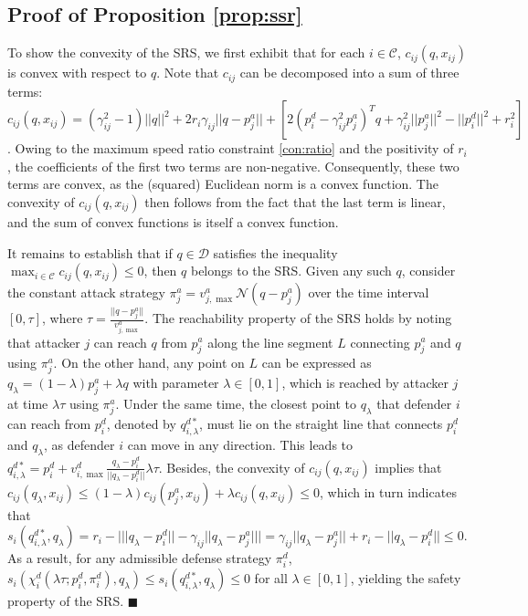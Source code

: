 \documentclass[journal]{IEEEtran}
\newenvironment{Proof}{\noindent{\em Proof:\/}}{\hfill $\blacksquare$\par}
\newcommand{\n}{\mathscr{N}}
\newcommand{\D}{\mathcal{D}}
\newcommand{\C}{\mathcal{C}}
\newcommand{\1}{\mathbf{1}}
\begin{document}
\subsection{Proof of Proposition \ref{prop:ssr}}\label{proof:ssr}
\begin{Proof}
To show the convexity of the SRS, we first exhibit that for each $i\in \C$, $c_{ij}(q,x_{ij})$ is convex with respect to $q$. Note that $c_{ij}$ can be decomposed into a sum of three terms: $c_{ij}(q,x_{ij})=(\gamma_{ij}^2-1)||q||^2+2r_i\gamma_{ij}||q-p^a_j||+[2(p^d_i-\gamma_{ij}^2p^a_j)^Tq+\gamma_{ij}^2||p^a_j||^2-||p^d_i||^2+r_i^2]$.
Owing to the maximum speed ratio constraint \eqref{con:ratio} and the positivity of $r_i$, the coefficients of the first two terms are non-negative. Consequently, these two terms are convex, as the (squared) Euclidean norm is a convex function. The convexity of $c_{ij}(q,x_{ij})$ then follows from the fact that the last term is linear, and the sum of convex functions is itself a convex function.

It remains to establish that if $q\in \D$ satisfies the inequality $\max_{i\in \C}c_{ij}(q,x_{ij})\leq 0$, then $q$ belongs to the SRS. Given any such $q$, consider the constant attack strategy $\pi^a_j=v^a_{j,\max}\n(q-p^a_j)$ over the time interval $[0,\tau]$, where $\tau=\frac{||q-p^a_j||}{v^a_{j,\max}}$.
The reachability property of the SRS holds by noting that attacker $j$ can reach $q$ from $p^a_j$ along the line segment $L$ connecting $p^a_j$ and $q$ using $\pi^a_j$. 
On the other hand, any point on $L$ can be expressed as $q_\lambda=(1-\lambda)p^a_j+\lambda q$ with parameter $\lambda\in [0,1]$, which is reached by attacker $j$ at time $\lambda\tau$ using $\pi^a_j$. 
Under the same time, the closest point to $q_\lambda$ that defender $i$ can reach from $p^d_i$, denoted by $q^{d*}_{i,\lambda}$, must lie on the straight line that connects $p^d_i$ and $q_\lambda$, as defender $i$ can move in any direction. This leads to $q^{d*}_{i,\lambda}=p^d_i+v^d_{i,\max}\frac{q_\lambda-p^d_i}{||q_\lambda-p^d_i||}\lambda\tau$. Besides, the convexity of $c_{ij}(q,x_{ij})$ implies that $c_{ij}(q_{\lambda},x_{ij})\leq (1-\lambda)c_{ij}(p^a_j,x_{ij})+\lambda c_{ij}(q,x_{ij})\leq 0$, which in turn indicates that $s_i(q^{d*}_{i,\lambda},q_\lambda)=r_i-\bigl\lvert ||q_\lambda-p^d_i||-\gamma_{ij}||q_\lambda-p^a_j||\bigr\rvert=\gamma_{ij}||q_\lambda-p^a_j||+r_i-||q_\lambda-p^d_i||\leq 0$.
As a result, for any admissible defense strategy $\pi^d_i$,
$s_i(\chi^d_i(\lambda\tau;p^d_i,\pi^d_i),q_\lambda)\leq s_i(q^{d*}_{i,\lambda},q_\lambda)\leq0$ for all $\lambda\in [0,1]$, yielding the safety property of the SRS.
\end{Proof}
\end{document}
